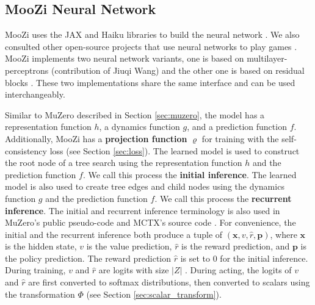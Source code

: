 \subsection{MooZi Neural Network} \label{sec:nn}
MooZi uses the JAX and Haiku libraries to build the neural network \cite{HaikuSonnetJAX_Hennigan.Cai.ea_2020,CompilingMachineLearning_Frostig.Johnson.ea_2019,JAXComposableTransformations_JamesBradbury.RoyFrostig.ea_2018}.
We also consulted other open-source projects that use neural networks to play games \cite{MuZeroGeneral_Duvaud.AureleHainaut_2022, MasteringAtariGames_Ye.Liu.ea_2021, AcceleratingSelfPlayLearning_Wu_2020}.
MooZi implements two neural network variants, one is based on multilayer-perceptrons (contribution of Jiuqi Wang) and the other one is based on residual blocks \cite{DeepResidualLearning_He.Zhang.ea_2016}.
These two implementations share the same interface and can be used interchangeably.

Similar to MuZero described in Section \ref{sec:muzero}, the model has a representation function $h$, a dynamics function $g$, and a prediction function $f$.
Additionally, MooZi has a \textbf{projection function} $\varrho$ for training with the self-consistency loss (see Section \ref{sec:loss}).
The learned model is used to construct the root node of a tree search using the representation function $h$ and the prediction function $f$.
We call this process the \textbf{initial inference}.
The learned model is also used to create tree edges and child nodes using the dynamics function $g$ and the prediction function $f$.
We call this process the \textbf{recurrent inference}.
The initial and recurrent inference terminology is also used in MuZero's public pseudo-code and MCTX's source code \cite{MasteringChessShogi_Silver.Hubert.ea_2017,MctxMCTSinJAX__2022}.
For convenience, the initial and the recurrent inference both produce a tuple of $(\mathbf{x}, v, \hat{r}, \mathbf{p})$, where $\mathbf{x}$ is the hidden state, $v$ is the value prediction, $\hat{r}$ is the reward prediction, and $\mathbf{p}$ is the policy prediction.
The reward prediction $\hat{r}$ is set to 0 for the initial inference.
During training, $v$ and $\hat{r}$ are logits with size $|Z|$ .
During acting, the logits of $v$ and $\hat{r}$ are first converted to softmax distributions, then converted to scalars using the transformation $\Phi$ (see Section \ref{sec:scalar_transform}).

